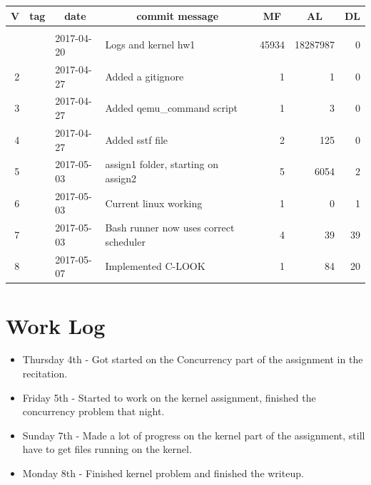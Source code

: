 \documentclass[letterpaper,10pt,titlepage, onecolumn, compsoc]{IEEEtran}
\begin{document}
\bigskip

\begin{longtable}{|rlllrrr|}
\hline \multicolumn{1}{|c}{\textbf{V}} & \multicolumn{1}{c}{\textbf{tag}}
& \multicolumn{1}{c}{\textbf{date}}
& \multicolumn{1}{c}{\textbf{commit message}} & \multicolumn{1}{c}{\textbf{MF}}
& \multicolumn{1}{c}{\textbf{AL}} & \multicolumn{1}{c|}{\textbf{DL}} \\ \hline
\endhead

\hline \multicolumn{7}{|r|}{} \\ \hline
\endfoot

\hline%
\endlastfoot

\hline 1 &  & 2017-04-20 & Logs and kernel hw1 & 45934 & 18287987 & 0 \\
\hline 2 &  & 2017-04-27 & Added a gitignore & 1 & 1 & 0 \\
\hline 3 &  & 2017-04-27 & Added qemu\_command script & 1 & 3 & 0 \\
\hline 4 &  & 2017-04-27 & Added sstf file & 2 & 125 & 0 \\
\hline 5 &  & 2017-05-03 & assign1 folder, starting on assign2 & 5 & 6054 & 2 \\
\hline 6 &  & 2017-05-03 & Current linux working & 1 & 0 & 1 \\
\hline 7 &  & 2017-05-03 & Bash runner now uses correct scheduler & 4 & 39 & 39 \\
\hline 8 &  & 2017-05-07 & Implemented C-LOOK & 1 & 84 & 20 \\
\end{longtable}

 
\section{Work Log}
\begin{itemize}
\item Thursday 4th - Got started on the Concurrency part of the assignment in the recitation.
\item Friday 5th - Started to work on the kernel assignment, finished the concurrency problem that night. 
\item Sunday 7th - Made a lot of progress on the kernel part of the assignment, still have to get files running on the kernel.  
\item Monday 8th - Finished kernel problem and finished the writeup.
\end{itemize}
\end{document}

